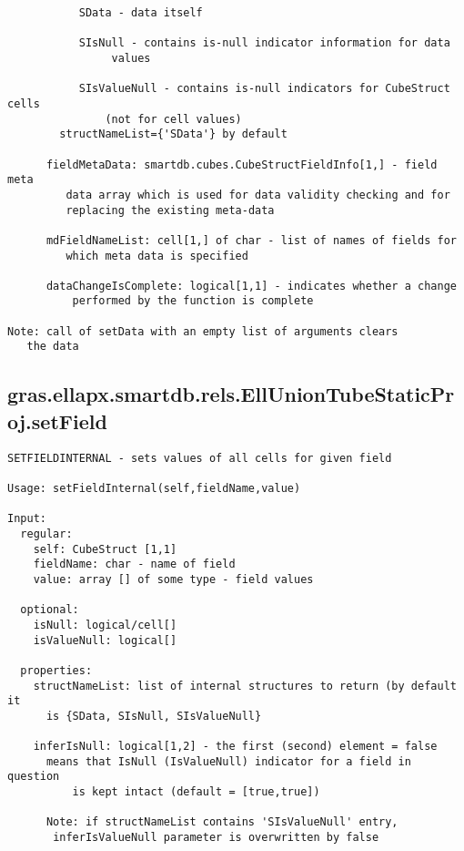 \begin{verbatim}
           SData - data itself

           SIsNull - contains is-null indicator information for data
                values

           SIsValueNull - contains is-null indicators for CubeStruct cells
               (not for cell values)
        structNameList={'SData'} by default

      fieldMetaData: smartdb.cubes.CubeStructFieldInfo[1,] - field meta
         data array which is used for data validity checking and for
         replacing the existing meta-data

      mdFieldNameList: cell[1,] of char - list of names of fields for
         which meta data is specified

      dataChangeIsComplete: logical[1,1] - indicates whether a change
          performed by the function is complete

Note: call of setData with an empty list of arguments clears
   the data
\end{verbatim}
\subsection{\texorpdfstring{gras.ellapx.smartdb.rels.EllUnionTubeStaticProj.setField}{setField}}\label{method:gras.ellapx.smartdb.rels.EllUnionTubeStaticProj.setField}
\begin{verbatim}
SETFIELDINTERNAL - sets values of all cells for given field

Usage: setFieldInternal(self,fieldName,value)

Input:
  regular:
    self: CubeStruct [1,1]
    fieldName: char - name of field
    value: array [] of some type - field values

  optional:
    isNull: logical/cell[]
    isValueNull: logical[]

  properties:
    structNameList: list of internal structures to return (by default it
      is {SData, SIsNull, SIsValueNull}

    inferIsNull: logical[1,2] - the first (second) element = false
      means that IsNull (IsValueNull) indicator for a field in question
          is kept intact (default = [true,true])

      Note: if structNameList contains 'SIsValueNull' entry,
       inferIsValueNull parameter is overwritten by false
\end{verbatim}
